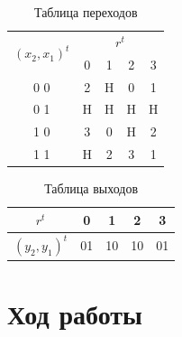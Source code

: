 \documentclass[a4paper,12pt]{article}
\begin{document}
    \begin{minipage}{0.5\linewidth}
        \begin{table}[H]
            \centering
            \begin{tabular}{|cl|cccc|}
            \hline
            \multicolumn{2}{|c|}{\multirow{2}{*}{$(x_2, x_1)^t$}} & \multicolumn{4}{c|}{$r^t$}                                                   \\ \cline{3-6} 
            \multicolumn{2}{|c|}{}                                & \multicolumn{1}{c|}{0} & \multicolumn{1}{c|}{1} & \multicolumn{1}{c|}{2} & 3 \\ \hline
            \multicolumn{2}{|c|}{0 0}                             & \multicolumn{1}{c|}{2} & \multicolumn{1}{c|}{H} & \multicolumn{1}{c|}{0} & 1 \\ \hline
            \multicolumn{2}{|c|}{0 1}                             & \multicolumn{1}{c|}{H} & \multicolumn{1}{c|}{H} & \multicolumn{1}{c|}{H} & H \\ \hline
            \multicolumn{2}{|c|}{1 0}                             & \multicolumn{1}{c|}{3} & \multicolumn{1}{c|}{0} & \multicolumn{1}{c|}{H} & 2 \\ \hline
            \multicolumn{2}{|c|}{1 1}                             & \multicolumn{1}{c|}{H} & \multicolumn{1}{c|}{2} & \multicolumn{1}{c|}{3} & 1 \\ \hline
            \end{tabular}
            \caption{Таблица переходов}
            \label{tab:transtab}
        \end{table}
    \end{minipage}
    \begin{minipage}[b]{0.5\linewidth}
        \begin{table}[H]
            \centering
            \begin{tabular}{|c|c|c|c|c|}
            \hline
            $r^t$          & 0  & 1  & 2  & 3  \\ \hline
            $(y_2, y_1)^t$ & 01 & 10 & 10 & 01 \\ \hline
            \end{tabular}
            \caption{Таблица выходов}
        \end{table}
    \end{minipage}

    \newpage
    \section{Ход работы}
\end{document}
